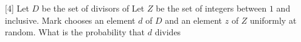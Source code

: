 [4] Let $D$ be the set of divisors of  Let $Z$ be the set of integers between $1$ and  inclusive. Mark chooses an element $d$ of $D$ and an element $z$ of $Z$ uniformly at random. What is the probability that $d$ divides 